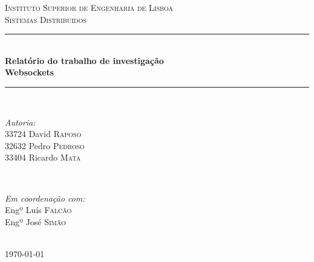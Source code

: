 \documentclass[a4paper]{article}
\newcommand{\HRule}{\rule{\linewidth}{0.5mm}} %
\begin{document}
\begin{titlepage}

\center %
 

\textsc{\LARGE Instituto Superior de Engenharia de Lisboa}\\[1.5cm] %
\textsc{\Large Sistemas Distribuidos}\\[0.5cm] %


\HRule \\[0.4cm]
{ \huge \bfseries Relatório do trabalho de investigação}\\[0.4cm] %
{ \Large \bfseries Websockets}\\
\HRule \\[1.5cm]
 

\begin{minipage}{0.4\textwidth}
\begin{flushleft} \large
\emph{Autoria:}\\
33724 David \textsc{Raposo} \\
32632 Pedro \textsc{Pedroso} \\
33404 Ricardo \textsc{Mata} \\
\end{flushleft}
\end{minipage}
~
\begin{minipage}{0.4\textwidth}
\begin{flushright} \large
\emph{Em coordenação com:} \\
Engº Luís \textsc{Falcão} \\ %
Engº José \textsc{Simão} \\ 
\end{flushright}
\end{minipage}\\[4cm]

{\large \today}\\[3cm] %

\vfill %

\end{titlepage}
\end{document}
